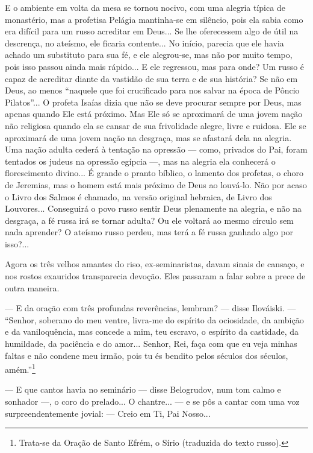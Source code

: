 E o ambiente em volta da mesa se tornou nocivo, com uma alegria típica
de monastério, mas a profetisa Pelágia mantinha-se em silêncio, pois ela
sabia como era difícil para um russo acreditar em Deus... Se lhe
oferecessem algo de útil na descrença, no ateísmo, ele ficaria
contente... No início, parecia que ele havia achado um substituto para
sua fé, e ele alegrou-se, mas não por muito tempo, pois isso passou
ainda mais rápido... E ele regressou, mas para onde? Um russo é capaz de
acreditar diante da vastidão de sua terra e de sua história? Se não em
Deus, ao menos ``naquele que foi crucificado para nos salvar na época de
Pôncio Pilatos''... O profeta Isaías dizia que não se deve procurar
sempre por Deus, mas apenas quando Ele está próximo. Mas Ele só se
aproximará de uma jovem nação não religiosa quando ela se cansar de sua
frivolidade alegre, livre e ruidosa. Ele se aproximará de uma jovem
nação na desgraça, mas se afastará dela na alegria. Uma nação adulta
cederá à tentação na opressão --- como, privados do Pai, foram tentados
os judeus na opressão egípcia ---, mas na alegria ela conhecerá o
florescimento divino... É grande o pranto bíblico, o lamento dos
profetas, o choro de Jeremias, mas o homem está mais próximo de Deus ao
louvá-lo. Não por acaso o Livro dos Salmos é chamado, na versão original
hebraica, de Livro dos Louvores... Conseguirá o povo russo sentir Deus
plenamente na alegria, e não na desgraça, a fé russa irá se tornar
adulta? Ou ele voltará ao mesmo círculo sem nada aprender? O ateísmo
russo perdeu, mas terá a fé russa ganhado algo por isso?...

Agora os três velhos amantes do riso, ex-seminaristas, davam sinais de
cansaço, e nos rostos exauridos transparecia devoção. Eles passaram a
falar sobre a prece de outra maneira.

--- E da oração com três profundas reverências, lembram? --- disse
Ilováiski. --- ``Senhor, soberano do meu ventre, livra-me do espírito da
ociosidade, da ambição e da vaniloquência, mas concede a mim, teu
escravo, o espírito da castidade, da humildade, da paciência e do
amor... Senhor, Rei, faça com que eu veja minhas faltas e não condene
meu irmão, pois tu és bendito pelos séculos dos séculos,
amém.''\footnote{Trata-se da Oração de Santo Efrém, o Sírio (traduzida
  do texto russo).}

--- E que cantos havia no seminário --- disse Belogrudov, num tom calmo
e sonhador ---, o coro do prelado... O chantre... --- e se pôs a cantar
com uma voz surpreendentemente jovial: --- Creio em Ti, Pai Nosso...

